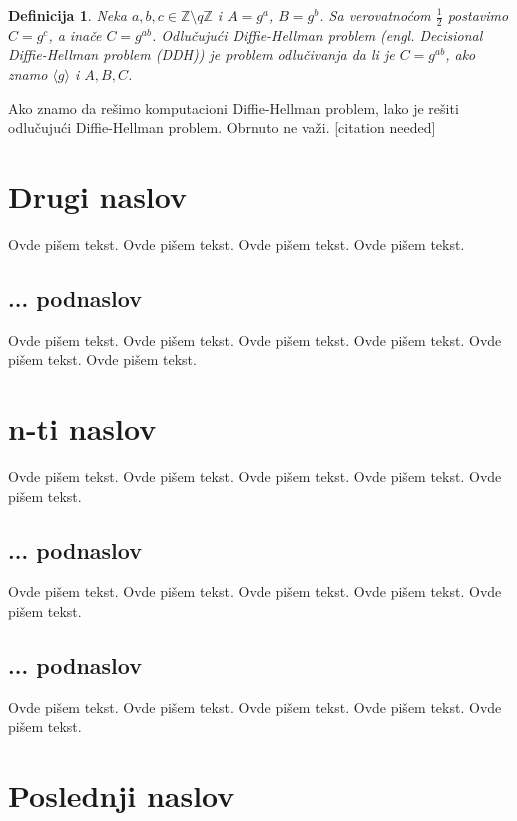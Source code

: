 \documentclass[a4paper]{article}
\newtheorem{defn}[primer]{Definicija}
\begin{document}
{\begin{defn}
    Neka $a,b,c\in \mathbb{Z}\setminus q\mathbb{Z}$ i $A = g^a$, $B = g^b$. Sa verovatnoćom $\frac{1}{2}$ postavimo $C = g^c$, 
    a inače $C = g^{ab}$. Odlučujući Diffie-Hellman problem (engl. \emph{Decisional Diffie-Hellman problem (DDH)}) je problem
    odlučivanja da li je $C = g^{ab}$, ako znamo $\langle g \rangle$ i $A, B, C$.
\end{defn}

Ako znamo da rešimo komputacioni Diffie-Hellman problem, lako je rešiti odlučujući Diffie-Hellman problem.
Obrnuto ne važi. [citation needed]

\section{Drugi naslov}
\label{sec:naslov2}

Ovde pišem tekst. 
Ovde pišem tekst. 
Ovde pišem tekst. 
Ovde pišem tekst. 

\subsection{... podnaslov}
\label{subsec:podnaslovN}

Ovde pišem tekst. 
Ovde pišem tekst. 
Ovde pišem tekst. 
Ovde pišem tekst. 
Ovde pišem tekst. 
Ovde pišem tekst. 

\section{n-ti naslov}
\label{sec:naslovN}

Ovde pišem tekst. 
Ovde pišem tekst. 
Ovde pišem tekst. 
Ovde pišem tekst. 
Ovde pišem tekst. 

\subsection{... podnaslov}
\label{subsec:podnaslovK}

Ovde pišem tekst. 
Ovde pišem tekst. 
Ovde pišem tekst. 
Ovde pišem tekst. 
Ovde pišem tekst. 

\subsection{... podnaslov}
\label{subsec:podnaslovM}

Ovde pišem tekst. 
Ovde pišem tekst. 
Ovde pišem tekst. 
Ovde pišem tekst. 
Ovde pišem tekst. 

\section{Poslednji naslov}
\label{sec:naslovM}

}
\end{document}
